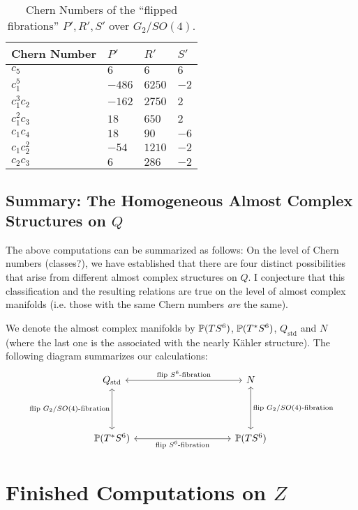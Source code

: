 \documentclass{scrartcl}
\begin{document}
\begin{table}[ht!]\centering
	\begin{tabular}{llll} \toprule
		Chern Number& $P'$	& $R'$	& $S'$	\\ \midrule
		$c_5$ 		& $6$ 	& $6$	& $6$ 	\\
		$c_1^5$ 	& $-486$& $6250$& $-2$	\\
		$c_1^3c_2$ 	& $-162$& $2750$& $2$	\\
		$c_1^2c_3$ 	& $18$	& $650$	& $2$	\\
		$c_1c_4$ 	& $18$	& $90$	& $-6$	\\
		$c_1c_2^2$	& $-54$	& $1210$& $-2$	\\
		$c_2c_3$	& $6$	& $286$	& $-2$	\\ \bottomrule
	\end{tabular}
	\caption{Chern Numbers of the ``flipped fibrations'' $P',R',S'$ over $G_2/SO(4)$.}
\end{table}

\subsection{Summary: The Homogeneous Almost Complex Structures on $Q$}

The above computations can be summarized as follows: On the level of Chern numbers (classes?), we have established that there are four distinct possibilities that arise from different almost complex structures on $Q$. I conjecture that this classification and the resulting relations are true on the level of almost complex manifolds (i.e. those with the same Chern numbers \emph{are} the same). 

We denote the almost complex manifolds by $\P(TS^6)$, $\P(T^*S^6)$, $Q_\text{std}$ and $N$ (where the last one is the associated with the nearly K\"{a}hler structure). The following diagram summarizes our calculations:
\begin{equation*}
	\begin{tikzcd}[column sep=3.5cm,row sep=1.5cm]
		Q_\text{std} \ar[r,leftrightarrow,"\text{flip }S^6\text{-fibration}"] 
		\ar[d,leftrightarrow,"\text{flip }G_2/SO(4)\text{-fibration}"']
		& N \ar[d,leftrightarrow,"\text{flip }G_2/SO(4)\text{-fibration}"]\\
		\P(T^*S^6) \ar[r,leftrightarrow,"\text{flip }S^6\text{-fibration}"']
		& \P(TS^6)
	\end{tikzcd}
\end{equation*}

\section{Finished Computations on $Z$}
\end{document}
